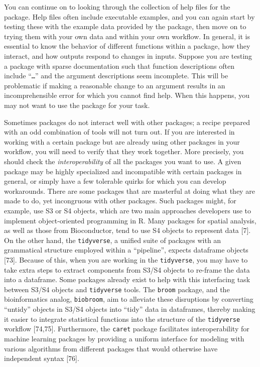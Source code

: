 \documentclass[10pt,letterpaper]{article}
\begin{document}
You can continue on to looking through the collection of help files for
the package. Help files often include executable examples, and you can
again start by testing these with the example data provided by the
package, then move on to trying them with your own data and within your
own workflow. In general, it is essential to know the behavior of
different functions within a package, how they interact, and how outputs
respond to changes in inputs. Suppose you are testing a package with
sparse documentation such that function descriptions often include
``\texttt{\ldots{}}'' and the argument descriptions seem incomplete.
This will be problematic if making a reasonable change to an argument
results in an incomprehensible error for which you cannot find help.
When this happens, you may not want to use the package for your task.

Sometimes packages do not interact well with other packages; a recipe
prepared with an odd combination of tools will not turn out. If you are
interested in working with a certain package but are already using other
packages in your workflow, you will need to verify that they work
together. More precisely, you should check the \emph{interoperability}
of all the packages you want to use. A given package may be highly
specialized and incompatible with certain packages in general, or simply
have a few tolerable quirks for which you can develop workarounds. There
are some packages that are masterful at doing what they are made to do,
yet incongruous with other packages. Such packages might, for example,
use S3 or S4 objects, which are two main approaches developers use to
implement object-oriented programming in R. Many packages for spatial
analysis, as well as those from Bioconductor, tend to use S4 objects to
represent data {[}7{]}. On the other hand, the \texttt{tidyverse}, a
unified suite of packages with an grammatical structure employed within
a ``pipeline'', expects dataframe objects {[}73{]}. Because of this,
when you are working in the \texttt{tidyverse}, you may have to take
extra steps to extract components from S3/S4 objects to re-frame the
data into a dataframe. Some packages already exist to help with this
interfacing task between S3/S4 objects and \texttt{tidyverse} tools. The
\texttt{broom} package, and the bioinformatics analog,
\texttt{biobroom}, aim to alleviate these disruptions by converting
``untidy'' objects in S3/S4 objects into ``tidy'' data in dataframes,
thereby making it easier to integrate statistical functions into the
structure of the \texttt{tidyverse} workflow {[}74,75{]}. Furthermore,
the \texttt{caret} package facilitates interoperability for machine
learning packages by providing a uniform interface for modeling with
various algorithms from different packages that would otherwise have
independent syntax {[}76{]}.
\end{document}
